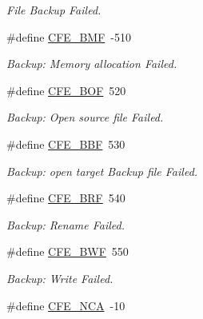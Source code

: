 \begin{DoxyCompactItemize}
\begin{DoxyCompactList}\small\item\em File Backup Failed. \end{DoxyCompactList}\item 
\hypertarget{group__errors_ga722db0752b9a2f977065b8001da18101}{\#define \hyperlink{group__errors_ga722db0752b9a2f977065b8001da18101}{C\-F\-E\-\_\-\-B\-M\-F}~-\/510}\label{group__errors_ga722db0752b9a2f977065b8001da18101}

\begin{DoxyCompactList}\small\item\em Backup\-: Memory allocation Failed. \end{DoxyCompactList}\item 
\hypertarget{group__errors_gada14f93a466c819b6286bcf7f85bbbe5}{\#define \hyperlink{group__errors_gada14f93a466c819b6286bcf7f85bbbe5}{C\-F\-E\-\_\-\-B\-O\-F}~520}\label{group__errors_gada14f93a466c819b6286bcf7f85bbbe5}

\begin{DoxyCompactList}\small\item\em Backup\-: Open source file Failed. \end{DoxyCompactList}\item 
\hypertarget{group__errors_ga793b92e4f9ea3a7acde0cc0dcf80701f}{\#define \hyperlink{group__errors_ga793b92e4f9ea3a7acde0cc0dcf80701f}{C\-F\-E\-\_\-\-B\-B\-F}~530}\label{group__errors_ga793b92e4f9ea3a7acde0cc0dcf80701f}

\begin{DoxyCompactList}\small\item\em Backup\-: open target Backup file Failed. \end{DoxyCompactList}\item 
\hypertarget{group__errors_gaee4caa017da2daf88aa192647f5ebaba}{\#define \hyperlink{group__errors_gaee4caa017da2daf88aa192647f5ebaba}{C\-F\-E\-\_\-\-B\-R\-F}~540}\label{group__errors_gaee4caa017da2daf88aa192647f5ebaba}

\begin{DoxyCompactList}\small\item\em Backup\-: Rename Failed. \end{DoxyCompactList}\item 
\hypertarget{group__errors_ga58992d0fae72c0a93a8fb1ec9cc1cd9c}{\#define \hyperlink{group__errors_ga58992d0fae72c0a93a8fb1ec9cc1cd9c}{C\-F\-E\-\_\-\-B\-W\-F}~550}\label{group__errors_ga58992d0fae72c0a93a8fb1ec9cc1cd9c}

\begin{DoxyCompactList}\small\item\em Backup\-: Write Failed. \end{DoxyCompactList}\item 
\hypertarget{group__errors_gaf8cd36471ddcc549668f49238855609d}{\#define \hyperlink{group__errors_gaf8cd36471ddcc549668f49238855609d}{C\-F\-E\-\_\-\-N\-C\-A}~-\/10}\label{group__errors_gaf8cd36471ddcc549668f49238855609d}


\end{DoxyCompactItemize}
